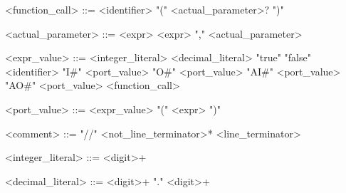 \begin{grammar}
 <function\_call> ::= <identifier> "(" <actual\_parameter>? ")"
 
 <actual\_parameter> ::= <expr>
 \alt <expr> "," <actual\_parameter>
 
 <expr\_value> ::= <integer\_literal>
 \alt <decimal\_literal>
 \alt "true"
 \alt "false"
 \alt <identifier>
 \alt "I\#" <port\_value>
 \alt "O\#" <port\_value>
 \alt "AI\#" <port\_value>
 \alt "AO\#" <port\_value>
 \alt <function\_call>
 
 <port\_value> ::= <expr\_value>
 \alt "(" <expr> ")"
 
 <comment> ::= "//" <not\_line\_terminator>* <line\_terminator>
 
 <integer\_literal> ::= <digit>+
 
 <decimal\_literal> ::= <digit>+ "." <digit>+

\end{grammar}